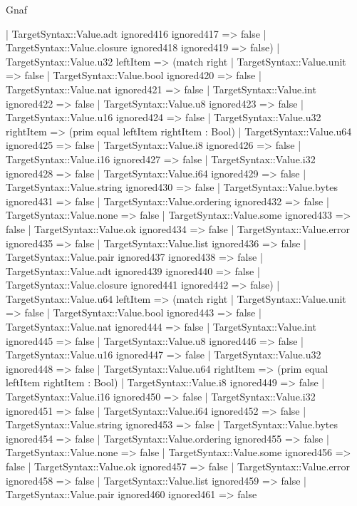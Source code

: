 \begin{lexlean}{Gnaf}
\begin{semanticmodule}
{      | TargetSyntax::Value.adt ignored416 ignored417 => false
      | TargetSyntax::Value.closure ignored418 ignored419 => false)
    | TargetSyntax::Value.u32 leftItem => (match right
      | TargetSyntax::Value.unit => false
      | TargetSyntax::Value.bool ignored420 => false
      | TargetSyntax::Value.nat ignored421 => false
      | TargetSyntax::Value.int ignored422 => false
      | TargetSyntax::Value.u8 ignored423 => false
      | TargetSyntax::Value.u16 ignored424 => false
      | TargetSyntax::Value.u32 rightItem => (prim equal leftItem rightItem : Bool)
      | TargetSyntax::Value.u64 ignored425 => false
      | TargetSyntax::Value.i8 ignored426 => false
      | TargetSyntax::Value.i16 ignored427 => false
      | TargetSyntax::Value.i32 ignored428 => false
      | TargetSyntax::Value.i64 ignored429 => false
      | TargetSyntax::Value.string ignored430 => false
      | TargetSyntax::Value.bytes ignored431 => false
      | TargetSyntax::Value.ordering ignored432 => false
      | TargetSyntax::Value.none => false
      | TargetSyntax::Value.some ignored433 => false
      | TargetSyntax::Value.ok ignored434 => false
      | TargetSyntax::Value.error ignored435 => false
      | TargetSyntax::Value.list ignored436 => false
      | TargetSyntax::Value.pair ignored437 ignored438 => false
      | TargetSyntax::Value.adt ignored439 ignored440 => false
      | TargetSyntax::Value.closure ignored441 ignored442 => false)
    | TargetSyntax::Value.u64 leftItem => (match right
      | TargetSyntax::Value.unit => false
      | TargetSyntax::Value.bool ignored443 => false
      | TargetSyntax::Value.nat ignored444 => false
      | TargetSyntax::Value.int ignored445 => false
      | TargetSyntax::Value.u8 ignored446 => false
      | TargetSyntax::Value.u16 ignored447 => false
      | TargetSyntax::Value.u32 ignored448 => false
      | TargetSyntax::Value.u64 rightItem => (prim equal leftItem rightItem : Bool)
      | TargetSyntax::Value.i8 ignored449 => false
      | TargetSyntax::Value.i16 ignored450 => false
      | TargetSyntax::Value.i32 ignored451 => false
      | TargetSyntax::Value.i64 ignored452 => false
      | TargetSyntax::Value.string ignored453 => false
      | TargetSyntax::Value.bytes ignored454 => false
      | TargetSyntax::Value.ordering ignored455 => false
      | TargetSyntax::Value.none => false
      | TargetSyntax::Value.some ignored456 => false
      | TargetSyntax::Value.ok ignored457 => false
      | TargetSyntax::Value.error ignored458 => false
      | TargetSyntax::Value.list ignored459 => false
      | TargetSyntax::Value.pair ignored460 ignored461 => false
}
\end{semanticmodule}
\end{lexlean}
